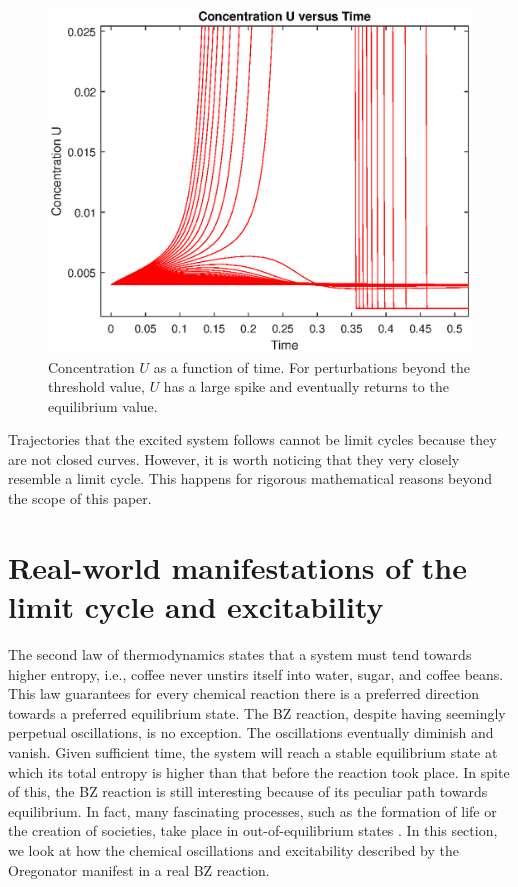 \documentclass[twocolumn,amsmath,amssymb,aps]{revtex4}
\begin{document}
\begin{figure}[!htb]
	\centering
	\includegraphics[scale=0.5]{UvTime.eps}
	\caption{Concentration $U$ as a function of time. For perturbations beyond the threshold value, $U$ has a large spike and eventually returns to the equilibrium value.}
	\label{fig:Excite4}
\end{figure}

Trajectories that the excited system follows cannot be limit cycles because they are not closed curves. However, it is worth noticing that they very closely resemble a limit cycle. This happens for rigorous mathematical reasons beyond the scope of this paper. 





\section{Real-world manifestations of the limit cycle and excitability}

The second law of thermodynamics states that a system must tend towards higher entropy, i.e., coffee never unstirs itself into water, sugar, and coffee beans. This law guarantees for every chemical reaction there is a preferred direction towards a preferred equilibrium state. The BZ reaction, despite having seemingly perpetual oscillations, is no exception. The oscillations eventually diminish and vanish. Given sufficient time, the system will reach a stable equilibrium state at which its total entropy is higher than that before the reaction took place. In spite of this, the BZ reaction is still interesting because of its peculiar path towards equilibrium. In fact, many fascinating processes, such as the formation of life or the creation of societies, take place in out-of-equilibrium states \cite{ball1999self}. In this section, we look at how the chemical oscillations and excitability described by the Oregonator manifest in a real BZ reaction.
\end{document}

